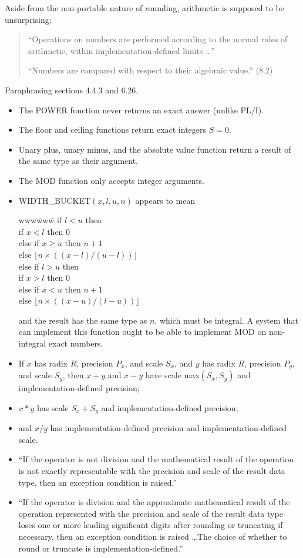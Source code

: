 \documentclass{article}
\begin{document}
Aside from the non-portable nature of rounding,
arithmetic is supposed to be unsurprising:
\begin{quote}
``Operations on numbers are performed according to the normal
rules of arithmetic, within implementation-defined limits \dots''

``Numbers are compared with respect to their algebraic value.'' (8.2)
\end{quote}

Paraphrasing sections 4.4.3 and 6.26,
\begin{itemize}
\item The POWER function never returns an exact answer (unlike PL/I).
\item The floor and ceiling functions return exact integers $S=0$.
\item Unary plus, unary minus, and the absolute value function return a result
of the same type as their argument.
\item  The MOD function only accepts integer arguments.
\item WIDTH\_BUCKET$(x, l, u, n)$ appears to mean
\begin{tabbing}
www\=www\=\kill
if $l < u$ then\\
\> if $x<l$ then 0\\
\> else if $x \ge u$ then $n+1$\\
\> else $\lfloor n\times((x-l)/(u-l)) \rfloor$\\
else if $l > u$ then\\
\> if $x > l$ then 0\\
\> else if $x < u$ then $n+1$\\
\> else $\lfloor n\times((x-u)/(l-u)) \rfloor$\\
\end{tabbing}
and the result has the same type as $n$, which must be integral.
A system that can implement this function ought to be able to
implement MOD on non-integral exact numbers.
\item If $x$ has radix $R$, precision $P_x$, and scale $S_x$,
and $y$ has radix $R$, precision $P_y$, and scale $S_y$,
then $x+y$ and $x-y$ have scale max$(S_x,S_y)$ and
implementation-defined precision;
\item $x*y$ has scale $S_x+S_y$ and implementation-defined precision;
\item and $x/y$ has implementation-defined precision and
implementation-defined scale.
\item ``If the operator is not division and the mathematical result of
the operation is not exactly representable with the precision and scale
of the result data type, then an exception condition is raised.''
\item ``If the operator is division and the approximate mathematical
result of the operation represented with the precision and scale of the
result data type loses one or more leading significant digits after
rounding or truncating if necessary, then an exception condition is
raised \dots The choice of whether to round or truncate is
implementation-defined.''
\end{itemize}
\end{document}
